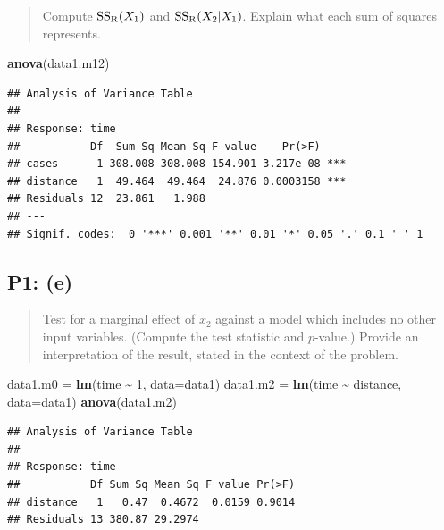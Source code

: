 \documentclass[
]{article}
\newenvironment{Shaded}{\begin{snugshade}}{\end{snugshade}}
\newcommand{\AttributeTok}[1]{\textcolor[rgb]{0.13,0.29,0.53}{#1}}
\newcommand{\DecValTok}[1]{\textcolor[rgb]{0.00,0.00,0.81}{#1}}
\newcommand{\FunctionTok}[1]{\textcolor[rgb]{0.13,0.29,0.53}{\textbf{#1}}}
\newcommand{\NormalTok}[1]{#1}
\newcommand{\OtherTok}[1]{\textcolor[rgb]{0.56,0.35,0.01}{#1}}
\newcommand{\SpecialCharTok}[1]{\textcolor[rgb]{0.81,0.36,0.00}{\textbf{#1}}}
\begin{document}
\begin{quote}
Compute \(\mathrm{SS_{R}}(X_1)\) and \(\mathrm{SS_{R}}(X_2|X_1)\). Explain what each sum
of squares represents.
\end{quote}

\begin{Shaded}
\begin{Highlighting}[]
\FunctionTok{anova}\NormalTok{(data1.m12)}
\end{Highlighting}
\end{Shaded}

\begin{verbatim}
## Analysis of Variance Table
## 
## Response: time
##           Df  Sum Sq Mean Sq F value    Pr(>F)    
## cases      1 308.008 308.008 154.901 3.217e-08 ***
## distance   1  49.464  49.464  24.876 0.0003158 ***
## Residuals 12  23.861   1.988                      
## ---
## Signif. codes:  0 '***' 0.001 '**' 0.01 '*' 0.05 '.' 0.1 ' ' 1
\end{verbatim}

\hypertarget{p1-e}{%
\subsection{P1: (e)}\label{p1-e}}

\begin{quote}
Test for a marginal effect of \(x_2\) against a model which includes no
other input variables. (Compute the test statistic and \(p\)-value.)
Provide an interpretation of the result, stated in the context of the
problem.
\end{quote}

\begin{Shaded}
\begin{Highlighting}[]
\NormalTok{data1.m0 }\OtherTok{=} \FunctionTok{lm}\NormalTok{(time }\SpecialCharTok{\textasciitilde{}} \DecValTok{1}\NormalTok{, }\AttributeTok{data=}\NormalTok{data1)}
\NormalTok{data1.m2 }\OtherTok{=} \FunctionTok{lm}\NormalTok{(time }\SpecialCharTok{\textasciitilde{}}\NormalTok{ distance, }\AttributeTok{data=}\NormalTok{data1)}
\FunctionTok{anova}\NormalTok{(data1.m2)}
\end{Highlighting}
\end{Shaded}

\begin{verbatim}
## Analysis of Variance Table
## 
## Response: time
##           Df Sum Sq Mean Sq F value Pr(>F)
## distance   1   0.47  0.4672  0.0159 0.9014
## Residuals 13 380.87 29.2974
\end{verbatim}
\end{document}
